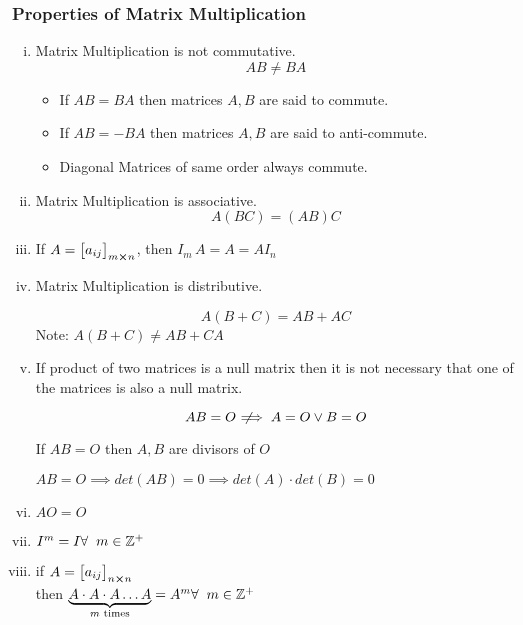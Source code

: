 \documentclass{article}
\newcommand{\notimplies}{\;\not\!\!\!\implies}
\begin{document}
\subsubsection{Properties of Matrix Multiplication}
\begin{enumerate}[i.]
    \item Matrix Multiplication is not commutative.
          $$AB \not= BA$$
          \begin{itemize}
              \item   If $AB=BA$ then matrices $A, B$ are said to commute.

              \item    If $AB=-BA$ then matrices $A, B$ are said to anti-commute.

              \item  Diagonal Matrices of same order always commute.
          \end{itemize}
    \item Matrix Multiplication is associative.
          $$A(BC)=(AB)C$$

    \item If $A={\begin{bmatrix}
                  a_{ij}
              \end{bmatrix}}_{m \cross n} $, then $I_{m} \, A=A=AI_{n} $

    \item Matrix Multiplication is distributive.

          $$A(B+C)=AB+AC$$
          Note: $A(B+C) \not= AB+CA$

    \item If product of two matrices is a null matrix then it is not necessary that one of the matrices is also a null matrix.

          $$AB=O \notimplies A=O \vee B=O$$

          If $AB=O$ then $A, B$ are divisors of $O$

          $AB=O \implies det(AB)=0 \implies det(A) \cdot det(B)=0$

    \item $AO=O$

    \item $I^m=I \hfill \forall \hspace{2mm} m \in \mathbb{Z^+}$

    \item if $A={\begin{bmatrix}
                  a_{ij}
              \end{bmatrix}}_{n \cross n} $ \\

          then $\underbrace{A \cdot A \cdot A \ldots A }_{m \text{ times}}=A^m \hfill \forall \hspace{2mm} m \in \mathbb{Z^+}$
\end{enumerate}
\end{document}
